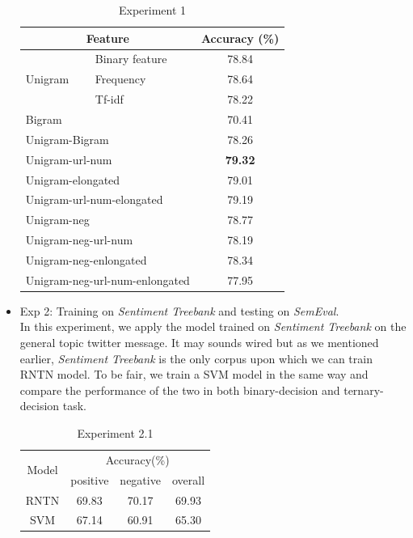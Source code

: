 \begin{itemize}
\begin{enumerate}
\end{enumerate}


\begin{table}[H]
  \begin{center}
    \begin{tabular}{llc}\hline
     \multicolumn{2}{c}{Feature} & Accuracy (\%)     \\\hline
     \multirow{3}{*}{Unigram}    & Binary feature  &  78.84  \\ 
                                 & Frequency       &  78.64  \\ 
                                 & Tf-idf          &  78.22 \\
     \multicolumn{2}{l}{Bigram}                    &  70.41 \\  
     \multicolumn{2}{l}{Unigram-Bigram}            &  78.26 \\         
     \multicolumn{2}{l}{Unigram-url-num}           &  \textbf{79.32} \\
     \multicolumn{2}{l}{Unigram-elongated}         &  79.01 \\
     \multicolumn{2}{l}{Unigram-url-num-elongated} &  79.19 \\
     \multicolumn{2}{l}{Unigram-neg}               &  78.77 \\
     \multicolumn{2}{l}{Unigram-neg-url-num}       &  78.19 \\
     \multicolumn{2}{l}{Unigram-neg-enlongated}    &  78.34 \\
     \multicolumn{2}{l}{Unigram-neg-url-num-enlongated}  &  77.95 \\\hline      
    \end{tabular}
    \end{center}
    \caption{\label{exp5_1} Experiment 1}
\end{table}

\item Exp 2: Training on \textit{Sentiment Treebank} and testing on \textit{SemEval}. \\ 
In this experiment, we apply the model trained on \textit{Sentiment Treebank} on the general topic twitter message. It may sounds wired but as we mentioned earlier, \textit{Sentiment Treebank} is the only corpus upon which we can train RNTN model. To be fair, we train a SVM model in the same way and compare the performance of the two in both binary-decision and ternary-decision task. 
\begin{table}[H]
  \begin{center}
    \begin{tabular}{cccc}\hline
      \multirow{2}{*}{Model} 
      & \multicolumn{3}{c}{Accuracy(\%)} \\\cline{2-4}
    & positive & negative & overall \\ \hline
    RNTN  & 69.83     &   70.17	    &   69.93    \\ 
    SVM   & 67.14     &   60.91     &   65.30      \\ \hline
    \end{tabular}
    \end{center}
    \caption{\label{exp5_2_1} Experiment 2.1}
\end{table}


\end{itemize}
